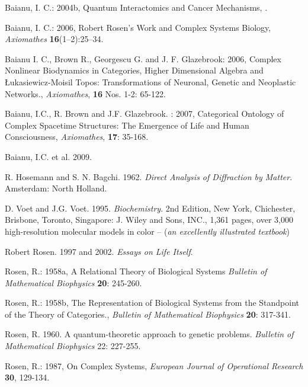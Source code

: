 \documentclass[12pt]{article}
\theoremstyle{plain}
\theoremstyle{definition}
\numberwithin{equation}{section}
\newcommand{\<}{{\langle}}
\begin{document}
\begin{thebibliography}{9}
Baianu, I. C.: 2004b, Quantum Interactomics and Cancer Mechanisms,
.

Baianu, I. C.: 2006, Robert Rosen's Work and Complex Systems Biology, \emph{Axiomathes} \textbf{16}(1--2):25--34.

Baianu I. C., Brown R., Georgescu G. and J. F. Glazebrook: 2006, Complex Nonlinear Biodynamics in Categories, Higher Dimensional Algebra and \L ukasiewicz-Moisil Topos: Transformations of Neuronal, Genetic and Neoplastic Networks., \emph{Axiomathes}, \textbf{16} Nos. 1-2: 65-122.

Baianu, I.C., R. Brown and J.F. Glazebrook. : 2007, Categorical Ontology of Complex Spacetime Structures: The Emergence of Life and Human Consciousness, \emph{Axiomathes}, \textbf{17}: 35-168.

Baianu, I.C. et al. 2009. 

R. Hosemann and S. N. Bagchi. 1962. \emph{Direct Analysis of Diffraction by Matter}. Amsterdam: North Holland.

D. Voet and J.G. Voet. 1995. \emph{Biochemistry}. 2nd Edition, New York, Chichester, Brisbone, Toronto,
Singapore: J. Wiley and Sons, INC., 1,361 pages, over 3,000 high-resolution molecular models in color -- (\emph{an excellently illustrated textbook})

Robert Rosen. 1997 and 2002. \emph{Essays on Life Itself}.

Rosen, R.: 1958a, A Relational Theory of Biological Systems
\emph{Bulletin of Mathematical Biophysics} \textbf{20}: 245-260.

Rosen, R.: 1958b, The Representation of Biological Systems from the Standpoint of the Theory of Categories.,
\emph{Bulletin of Mathematical Biophysics} \textbf{20}: 317-341.

Rosen, R. 1960. A quantum-theoretic approach to genetic problems. \emph{Bulletin of Mathematical Biophysics}
22: 227-255.

Rosen, R.: 1987, On Complex Systems, \emph{European Journal of Operational Research}
\textbf{30}, 129-134.


\end{thebibliography}
\end{document}
